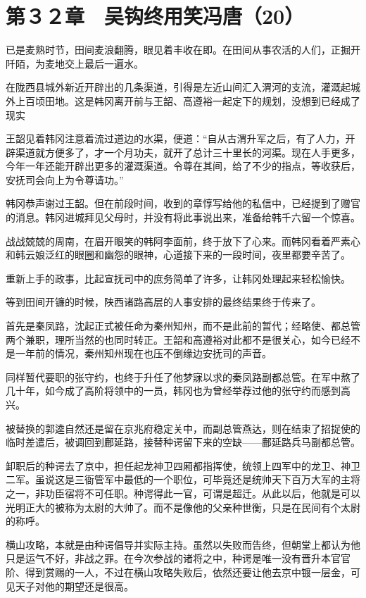 \section{第３２章　吴钩终用笑冯唐（20）}

已是麦熟时节，田间麦浪翻腾，眼见着丰收在即。在田间从事农活的人们，正掘开阡陌，为麦地交上最后一遍水。

在陇西县城外新近开辟出的几条渠道，引得是左近山间汇入渭河的支流，灌溉起城外上百顷田地。这是韩冈离开前与王韶、高遵裕一起定下的规划，没想到已经成了现实

王韶见着韩冈注意着流过道边的水渠，便道：“自从古渭升军之后，有了人力，开辟渠道就方便多了，才一个月功夫，就开了总计三十里长的河渠。现在人手更多，今年一年还能开辟出更多的灌溉渠道。令尊在其间，给了不少的指点，等收获后，安抚司会向上为令尊请功。”

韩冈恭声谢过王韶。但在前段时间，收到的章惇写给他的私信中，已经提到了赠官的消息。韩冈进城拜见父母时，并没有将此事说出来，准备给韩千六留一个惊喜。

战战兢兢的周南，在眉开眼笑的韩阿李面前，终于放下了心来。而韩冈看着严素心和韩云娘泛红的眼圈和幽怨的眼神，心道接下来的一段时间，夜里都要辛苦了。

重新上手的政事，比起宣抚司中的庶务简单了许多，让韩冈处理起来轻松愉快。

等到田间开镰的时候，陕西诸路高层的人事安排的最终结果终于传来了。

首先是秦凤路，沈起正式被任命为秦州知州，而不是此前的暂代；经略使、都总管两个兼职，理所当然的也同时转正。王韶和高遵裕对此都不是很关心，如今已经不是一年前的情况，秦州知州现在也压不倒缘边安抚司的声音。

同样暂代要职的张守约，也终于升任了他梦寐以求的秦凤路副都总管。在军中熬了几十年，如今成了高阶将领中的一员，韩冈也为曾经举荐过他的张守约而感到高兴。

被替换的郭逵自然还是留在京兆府稳定关中，而副总管燕达，则在结束了招捉使的临时差遣后，被调回到鄜延路，接替种谔留下来的空缺——鄜延路兵马副都总管。

卸职后的种谔去了京中，担任起龙神卫四厢都指挥使，统领上四军中的龙卫、神卫二军。虽说这是三衙管军中最低的一个职位，可毕竟还是统帅天下百万大军的主将之一，非功臣宿将不可任职。种谔得此一官，可谓是超迁。从此以后，他就是可以光明正大的被称为太尉的大帅了。而不是像他的父亲种世衡，只是在民间有个太尉的称呼。

横山攻略，本就是由种谔倡导并实际主持。虽然以失败而告终，但朝堂上都认为他只是运气不好，非战之罪。在今次参战的诸将之中，种谔是唯一没有晋升本官官阶、得到赏赐的一人，不过在横山攻略失败后，依然还要让他去京中镀一层金，可见天子对他的期望还是很高。

